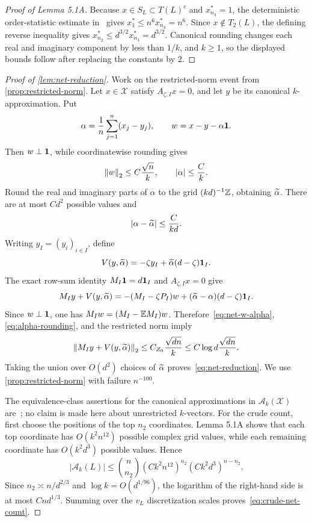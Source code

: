 \begin{proof}[Proof of Lemma 5.1A]
Because $x\in S_L\subset T(L)^c$ and $x_{n_3}^*=1$, the deterministic order-statistic estimate in~\cite[Lemma~4.2]{LLTTY19} gives $x_1^*\le n^6x_{n_3}^*=n^6$. Since $x\notin T_2(L)$, the defining reverse inequality gives $x_{n_2}^*\le d^{3/2}x_{n_3}^*=d^{3/2}$. Canonical rounding changes each real and imaginary component by less than $1/k$, and $k\ge1$, so the displayed bounds follow after replacing the constants by $2$.
\end{proof}

\begin{proof}[Proof of 
\cref{lem:net-reduction}]
Work on the restricted-norm event from 
\cref{prop:restricted-norm}. Let $x\in\mathcal X$ satisfy $A_{\zeta,I}x=0$, and let $y$ be its canonical $k$-approximation. Put
\[
  \alpha=\frac1n\sum_{j=1}^n(x_j-y_j),
  \qquad
  w=x-y-\alpha\mathbf 1.
\]
Then $w\perp\mathbf 1$, while coordinatewise rounding gives
\begin{equation}\label{eq:net-w-alpha}
  \left\|w\right\|_2\le C\frac{\sqrt n}{k},
  \qquad
  |\alpha|\le\frac Ck.
\end{equation}
Round the real and imaginary parts of $\alpha$ to the grid $(kd)^{-1}\mathbb Z$, obtaining $\widetilde\alpha$. There are at most $Cd^2$ possible values and
\begin{equation}\label{eq:alpha-rounding}
  |\alpha-\widetilde\alpha|\le\frac C{kd}.
\end{equation}
Writing $y_I=(y_i)_{i\in I}$, define
\[
  V(y,\widetilde\alpha)=-\zeta y_I+\widetilde\alpha(d-\zeta)\mathbf 1_I.
\]
The exact row-sum identity $M_I\mathbf 1=d\mathbf 1_I$ and $A_{\zeta,I}x=0$ give
\[
  M_Iy+V(y,\widetilde\alpha)
  =-(M_I-\zeta P_I)w+(\widetilde\alpha-\alpha)(d-\zeta)\mathbf 1_I.
\]
Since $w\perp\mathbf 1$, one has $M_Iw=(M_I-\mathbb E M_I)w$. Therefore~\eqref{eq:net-w-alpha}, \eqref{eq:alpha-rounding}, and the restricted norm imply
\[
  \left\|M_Iy+V(y,\widetilde\alpha)\right\|_2
  \le C_{Z_0}\frac{\sqrt{dn}}{k}
  \le C\log d\frac{\sqrt{dn}}{k}.
\]
Taking the union over $O(d^2)$ choices of $\widetilde\alpha$ proves~\eqref{eq:net-reduction}. We use 
\cref{prop:restricted-norm} with failure $n^{-100}$.

The equivalence-class assertions for the canonical approximations in $\mathcal A_k(\mathcal X)$ are~\cite[Lemmas~5.1 and 5.5]{LLTTY19}; no claim is made here about unrestricted $k$-vectors. For the crude count, first choose the positions of the top $n_2$ coordinates. Lemma 5.1A shows that each top coordinate has $O(k^2n^{12})$ possible complex grid values, while each remaining coordinate has $O(k^2d^3)$ possible values. Hence
\[
  |\mathcal A_k(L)|
  \le\binom n{n_2}(Ck^2n^{12})^{n_2}(Ck^2d^3)^{n-n_2}.
\]
Since $n_2\asymp n/d^{2/3}$ and $\log k=O(d^{1/96})$, the logarithm of the right-hand side is at most $Cnd^{1/3}$. Summing over the $v_L$ discretization scales proves~\eqref{eq:crude-net-count}.
\end{proof}

